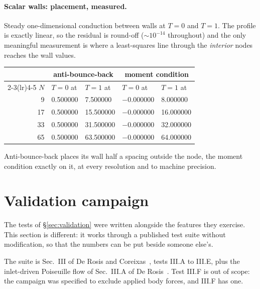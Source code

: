 \documentclass[11pt,a4paper]{article}
\begin{document}
\paragraph{Scalar walls: placement, measured.} Steady one-dimensional conduction
between walls at $T=0$ and $T=1$. The profile is exactly linear, so the residual
is round-off ($\sim10^{-14}$ throughout) and the only meaningful measurement is
where a least-squares line through the \emph{interior} nodes reaches the wall
values.
\begin{center}\small
\begin{tabular}{rllll}
\toprule
& \multicolumn{2}{c}{anti-bounce-back} & \multicolumn{2}{c}{moment condition} \\
\cmidrule(lr){2-3}\cmidrule(lr){4-5}
$N$ & $T=0$ at & $T=1$ at & $T=0$ at & $T=1$ at \\
\midrule
9  & 0.500000 & 7.500000  & $-0.000000$ & 8.000000  \\
17 & 0.500000 & 15.500000 & $-0.000000$ & 16.000000 \\
33 & 0.500000 & 31.500000 & $-0.000000$ & 32.000000 \\
65 & 0.500000 & 63.500000 & $-0.000000$ & 64.000000 \\
\bottomrule
\end{tabular}
\end{center}
\noindent Anti-bounce-back places its wall half a spacing outside the node, the
moment condition exactly on it, at every resolution and to machine precision.

\section{Validation campaign}
\label{sec:campaign}

The tests of \S\ref{sec:validation} were written alongside the features they
exercise. This section is different: it works through a published test suite
without modification, so that the numbers can be put beside someone else's.

The suite is Sec.~III of De Rosis and Coreixas~\cite{derosis2020}, tests III.A
to III.E, plus the inlet-driven Poiseuille flow of Sec.~III.A of De
Rosis~\cite{derosis2017pre}. Test III.F is out of scope: the campaign was
specified to exclude applied body forces, and III.F has one.
\end{document}
